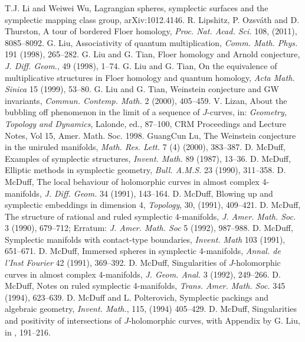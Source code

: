  T.J. Li and Weiwei Wu, Lagrangian spheres, symplectic surfaces and the symplectic mapping class group, arXiv:1012.4146.
 R. Lipshitz, P. Ozsv\'ath and D. Thurston, A tour of bordered Floer homology, \emph{Proc. Nat. Acad. Sci.} 108, (2011), 8085--8092.
 G. Liu, Associativity of quantum multiplication, \emph{Comm. Math. Phys.} 191 (1998), 265--282.
 G. Liu and G. Tian, Floer homology and Arnold conjecture, \emph{J. Diff. Geom.}, 49 (1998), 1--74.
 G. Liu and G. Tian, On the equivalence of multiplicative structures in Floer homology and quantum homology, \emph{Acta Math. Sinica} 15 (1999), 53--80.
 G. Liu and G. Tian, Weinstein conjecture and GW invariants, \emph{Commun. Contemp. Math.} 2 (2000), 405--459.
 V. Lizan, About the bubbling off phenomenon in the limit of a sequence of $J$-curves, in: \emph{Geometry, Topology and Dynamics}, Lalonde, ed., 87--100, CRM Proceedings and Lecture Notes, Vol 15, Amer. Math. Soc. 1998.
 GuangCun Lu, The Weinstein conjecture in the uniruled manifolds, \emph{Math. Res. Lett.} 7 (4) (2000), 383--387.
 D. McDuff, Examples of symplectic structures, \emph{Invent. Math.} 89 (1987), 13--36.
 D. McDuff, Elliptic methods in symplectic geometry, \emph{Bull. A.M.S.} 23 (1990), 311--358.
 D. McDuff, The local behaviour of holomorphic curves in almost complex 4-manifolds, \emph{J. Diff. Geom.} 34 (1991), 143--164.
 D. McDuff, Blowing up and symplectic embeddings in dimension 4, \emph{Topology}, 30, (1991), 409--421.
 D. McDuff, The structure of rational and ruled symplectic 4-manifolds, \emph{J. Amer. Math. Soc.} 3 (1990), 679--712; Erratum: \emph{J. Amer. Math. Soc} 5 (1992), 987--988.
 D. McDuff, Symplectic manifolds with contact-type boundaries, \emph{Invent. Math} 103 (1991), 651--671.
 D. McDuff, Immersed spheres in symplectic 4-manifolds, \emph{Annal. de l'Inst Fourier} 42 (1991), 369--392.
 D. McDuff, Singularities of $J$-holomorphic curves in almost complex 4-manifolds, \emph{J. Geom. Anal.} 3 (1992), 249--266.
 D. McDuff, Notes on ruled symplectic 4-manifolds, \emph{Trans. Amer. Math. Soc.} 345 (1994), 623--639.
 D. McDuff and L. Polterovich, Symplectic packings and algebraic geometry, \emph{Invent. Math.}, 115, (1994) 405--429.
 D. McDuff, Singularities and positivity of intersections of $J$-holomorphic curves, with Appendix by G. Liu, in \cite{src-25}, 191--216.
